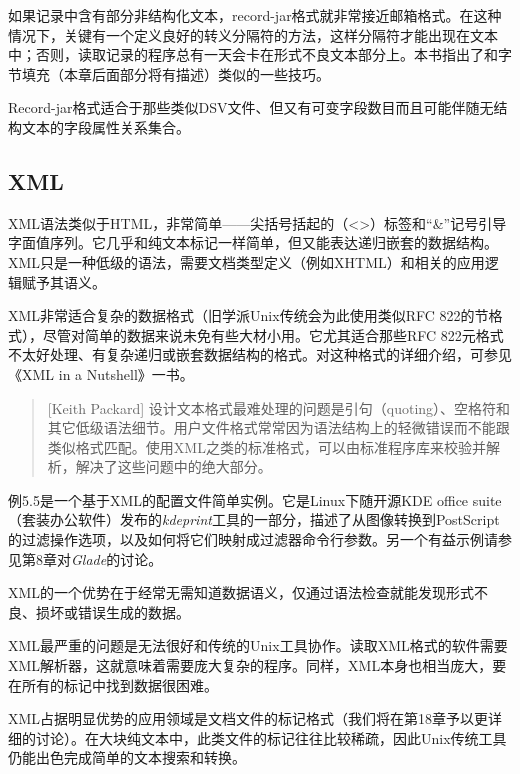 \documentclass[12pt,oneside]{book}
\begin{document}
\begin{common-format}
如果记录中含有部分非结构化文本，record-jar格式就非常接近邮箱格式。在这种情况下，关键有一个定义良好的转义分隔符的方法，这样分隔符才能出现在文本中；否则，读取记录的程序总有一天会卡在形式不良文本部分上。本书指出了和字节填充（本章后面部分将有描述）类似的一些技巧。

Record-jar格式适合于那些类似DSV文件、但又有可变字段数目而且可能伴随无结构文本的字段属性关系集合。
 
\subsection{ XML}
XML语法类似于HTML，非常简单——尖括号括起的（<>）标签和“\&{}”记号引导字面值序列。它几乎和纯文本标记一样简单，但又能表达递归嵌套的数据结构。XML只是一种低级的语法，需要文档类型定义（例如XHTML）和相关的应用逻辑赋予其语义。

XML非常适合复杂的数据格式（旧学派Unix传统会为此使用类似RFC 822的节格式），尽管对简单的数据来说未免有些大材小用。它尤其适合那些RFC 822元格式不太好处理、有复杂递归或嵌套数据结构的格式。对这种格式的详细介绍，可参见《XML in a Nutshell》一书\cite{Harold-Means}。
\begin{quote}[Keith Packard]
设计文本格式最难处理的问题是引句（quoting）、空格符和其它低级语法细节。用户文件格式常常因为语法结构上的轻微错误而不能跟类似格式匹配。使用XML之类的标准格式，可以由标准程序库来校验并解析，解决了这些问题中的绝大部分。
\end{quote}

例5.5是一个基于XML的配置文件简单实例。它是Linux下随开源KDE office suite（套装办公软件）发布的\textit{kdeprint}工具的一部分，描述了从图像转换到PostScript的过滤操作选项，以及如何将它们映射成过滤器命令行参数。另一个有益示例请参见第8章对\textit{Glade}的讨论。

XML的一个优势在于经常无需知道数据语义，仅通过语法检查就能发现形式不良、损坏或错误生成的数据。

XML最严重的问题是无法很好和传统的Unix工具协作。读取XML格式的软件需要XML解析器，这就意味着需要庞大复杂的程序。同样，XML本身也相当庞大，要在所有的标记中找到数据很困难。

XML占据明显优势的应用领域是文档文件的标记格式（我们将在第18章予以更详细的讨论）。在大块纯文本中，此类文件的标记往往比较稀疏，因此Unix传统工具仍能出色完成简单的文本搜索和转换。


\end{common-format}
\end{document}
